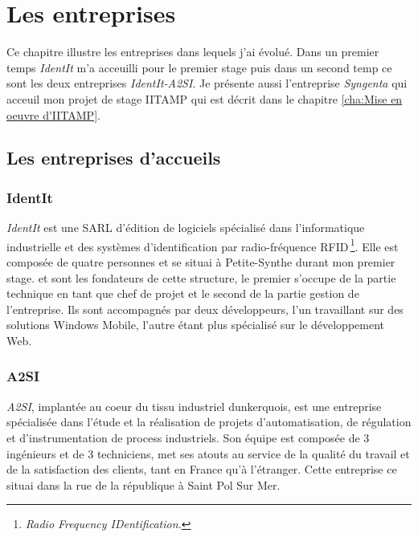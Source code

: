 \chapter{Les entreprises} %

\begin{it}

Ce chapitre illustre les entreprises dans lequels j'ai évolué. Dans un
premier temps \emph{IdentIt} m'a acceuilli pour le premier stage puis
dans un second temp ce sont les deux entreprises \emph{IdentIt-A2SI}. Je
présente aussi l'entreprise \emph{Syngenta} qui acceuil mon projet de
stage IITAMP qui est décrit dans le chapitre \ref{cha:Mise en oeuvre
d'IITAMP}.

\end{it}

\section{Les entreprises d'accueils} %
\label{sec:Les entreprises d'aceuils}

\subsection{IdentIt} %
\label{sub:IdentIt}

\emph{IdentIt} est une SARL d'édition de logiciels spécialisé dans
l'informatique industrielle et des systèmes d'identification par
radio-fréquence RFID\,\footnote{\emph{Radio Frequency IDentification.}}.
Elle est composée de quatre personnes et se situai à Petite-Synthe
durant mon premier stage.  et  sont les
fondateurs de cette structure, le premier s'occupe de la partie
technique en tant que chef de projet et le second de la partie gestion
de l'entreprise. Ils sont accompagnés par deux développeurs, l'un
travaillant sur des solutions Windows Mobile, l'autre étant plus
spécialisé sur le développement Web.


\subsection{A2SI} %
\label{sub:A2SI}

\emph{A2SI}, implantée au coeur du tissu industriel dunkerquois, est une
entreprise spécialisée dans l’étude et la réalisation de projets
d’automatisation, de régulation et d’instrumentation de process
industriels. Son équipe est composée de 3 ingénieurs et de 3
techniciens, met ses atouts au service de la qualité du travail et de la
satisfaction des clients, tant en France qu’à l’étranger. Cette
entreprise ce situai dans la rue de la république à Saint Pol Sur Mer.

